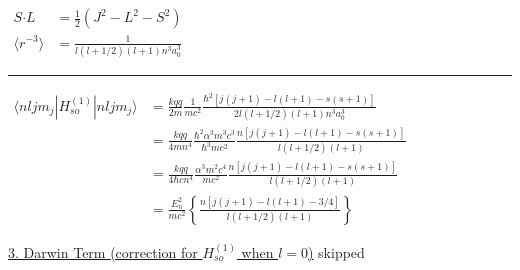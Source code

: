 \documentclass[12pt]{article}
\newcommand*{\dotP}{\boldsymbol \cdot}	%
\begin{document}
\vspace{10pt}\noindent
\(\begin{aligned}
    S \dotP L &= \frac{1}{2} \left( J^2 - L^2 - S^2\right)\\[5pt]
    \langle r^{-3} \rangle &= \frac{1}{l(l+1/2)(l+1)n^3a_0^3}
\end{aligned}\)
\hspace{5pt}
\rule[-75pt]{.5pt}{150pt}
\hspace{5pt}
\(\begin{aligned}
    \langle {\scriptstyle nljm_j} | H^{(1)}_{so} | {\scriptstyle nljm_j} \rangle 
        &= \frac{kqq}{2m} \frac{1}{m c^2} \frac{\hbar^2 [ j(j+1) - l(l+1) - s(s+1) ]}{ 2 l(l+1/2)(l+1) n^3 a_0^3} \\[5pt]
    &= \frac{kqq}{4 m n^4} \frac{\hbar^2 \alpha^3 m^3 c^3}{\hbar^3 m c^2} 
        \frac{n [ j(j+1) - l(l+1) - s(s+1) ]}{l(l+1/2)(l+1)}\\[5pt]
    &= \frac{kqq}{4 \hbar c n^4} \frac{\alpha^3 m^2 c^4}{m c^2} 
        \frac{n [ j(j+1) - l(l+1) - s(s+1) ]}{l(l+1/2)(l+1)}\\[5pt]
    &= \frac{E_n^2}{mc^2} \left\{ \frac{ n \left[ j(j+1) - l(l+1) - 3/4 \right] }{ l (l+1/2) (l+1) } \right\}
\end{aligned}\)

\vspace{20pt}\noindent
\underline{3. Darwin Term (correction for \(H_{so}^{(1)}\) when \(l=0\))} skipped
\end{document}
